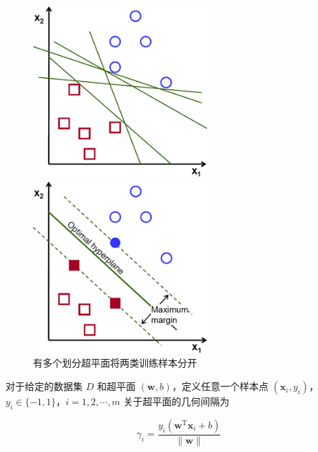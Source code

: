 \documentclass{ctexart}
\begin{document}
	\begin{figure}[!htb]
		\centering
		\begin{minipage}{0.49\linewidth}
			\centering
			\includegraphics[width=0.6\textwidth]{../image/正中间.png}
		\end{minipage}
		\begin{minipage}{0.49\linewidth}
			\centering
			\includegraphics[width=0.6\textwidth]{../image/正中间y.png}
		\end{minipage}
		\caption{有多个划分超平面将两类训练样本分开}
		\label{正中间}
	\end{figure}
	
	对于给定的数据集 $D$ 和超平面 $(\boldsymbol{w},b)$，定义任意一个样本点 $(\boldsymbol{x}_i,y_i)$，$y_i\in\{-1,1\}$，$i=1,2,\cdots,m$ 关于超平面的几何间隔为
	
	\begin{equation}
		\gamma_{i}=\frac{y_{i}\left(\boldsymbol{w}^{\mathrm{T}} \boldsymbol{x}_{i}+b\right)}{\|\boldsymbol{w}\|}
	\end{equation}
\end{document}
